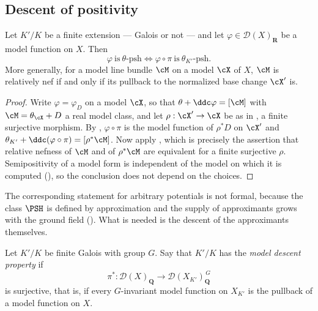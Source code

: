 \subsection{Descent of positivity}
\label{sec:ch30-descent-positivity}

\begin{theorem}
\label{thm:ch30-model-psh-descent}
Let $K'/K$ be a finite extension --- Galois or not --- and let
$\varphi\in\mathcal D(X)_{\mathbf R}$ be a model function on $X$.  Then
\[
 \varphi\ \text{is}\ \theta\text{-psh}
 \iff
 \varphi\circ\pi\ \text{is}\ \theta_{K'}\text{-psh}.
\]
More generally, for a model line bundle $\cM$ on a model $\cX$ of
$X$, $\cM$ is relatively nef if and only if its pullback to the
normalized base change $\cX'$ is.
\end{theorem}

\begin{proof}
Write $\varphi=\varphi_D$ on a model $\cX$, so that
$\theta+\ddc\varphi=[\cM]$ with $\cM=\theta_{\cX}+D$ a real model class, and let
$\rho:\cX'\to\cX$ be as in , a finite
surjective morphism.  By
, $\varphi\circ\pi$ is the
model function of $\rho^*D$ on $\cX'$ and
$\theta_{K'}+\ddc(\varphi\circ\pi)=[\rho^*\cM]$.  Now apply
, which is precisely the assertion
that relative nefness of $\cM$ and of $\rho^*\cM$ are equivalent for a
finite surjective $\rho$.  Semipositivity of a model form is independent
of the model on which it is computed
(), so the conclusion does not
depend on the choices.
\end{proof}

The corresponding statement for arbitrary potentials is not formal, because
the class $\PSH$ is defined by approximation and the supply of
approximants grows with the ground field
().  What is needed is the descent of the
approximants themselves.

\begin{definition}
\label{def:ch30-model-descent-property}
Let $K'/K$ be finite Galois with group $G$.  Say that $K'/K$ has the
\emph{model descent property} if
\begin{equation}
\label{eq:ch30-model-descent-property}
 \pi^*:\mathcal D(X)_{\mathbf Q}
 \longrightarrow
 \mathcal D(X_{K'})_{\mathbf Q}^{\,G}
\end{equation}
is surjective, that is, if every $G$-invariant model function on
$X_{K'}$ is the pullback of a model function on $X$.
\end{definition}

